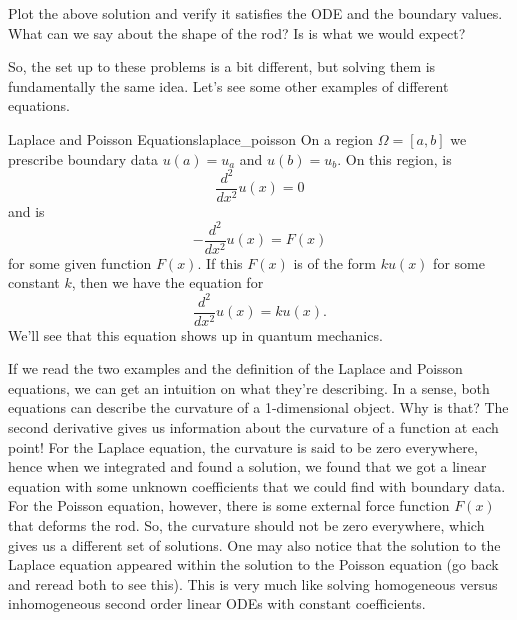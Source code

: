 \begin{exercise}
Plot the above solution and verify it satisfies the ODE and the boundary values.  What can we say about the shape of the rod? Is is what we would expect?
\end{exercise}

So, the set up to these problems is a bit different, but solving them is fundamentally the same idea. Let's see some other examples of different equations.

\begin{df}{Laplace and Poisson Equations}{laplace_poisson}
On a region $\Omega=[a,b]$ we prescribe boundary data $u(a)=u_a$ and $u(b)=u_b$.  On this region,  is
\[
\frac{d^2}{dx^2}u(x)=0
\]
and  is
\[
-\frac{d^2}{dx^2}u(x)=F(x)
\]
for some given function $F(x)$. If this $F(x)$ is of the form $ku(x)$ for some constant $k$, then we have the equation for 
\[
\frac{d^2}{dx^2}u(x)=ku(x).
\]
We'll see that this equation shows up in quantum mechanics.
\end{df}

If we read the two examples and the definition of the Laplace and Poisson equations, we can get an intuition on what they're describing.  In a sense, both equations can describe the curvature of a 1-dimensional object.  Why is that? The second derivative gives us information about the curvature of a function at each point! For the Laplace equation, the curvature is said to be zero everywhere, hence when we integrated and found a solution, we found that we got a linear equation with some unknown coefficients that we could find with boundary data.  For the Poisson equation, however, there is some external force function $F(x)$ that deforms the rod.  So, the curvature should not be zero everywhere, which gives us a different set of solutions.  One may also notice that the solution to the Laplace equation appeared within the solution to the Poisson equation (go back and reread both to see this).  This is very much like solving homogeneous versus inhomogeneous second order linear ODEs with constant coefficients.

